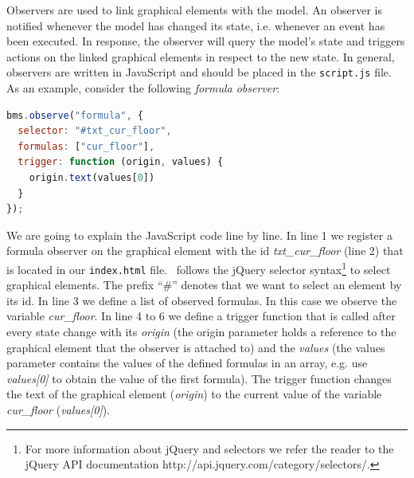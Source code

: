 Observers are used to link graphical elements with the model. 
An observer is notified whenever the model has changed its state, i.e. whenever an event has been executed. 
In response, the observer will query the model's state and triggers actions on the linked graphical elements in respect to the new state.
In general, observers are written in JavaScript and should be placed in the \texttt{script.js} file. 
As an example, consider the following \textit{formula observer}:

\begin{lstlisting}[language=JavaScript, caption={Formula Observer Displaying the Current Floor (JavaScript)}]
bms.observe("formula", {
  selector: "#txt_cur_floor",
  formulas: ["cur_floor"],
  trigger: function (origin, values) {
    origin.text(values[0])
  }
});
\end{lstlisting}


We are going to explain the JavaScript code line by line.
In line 1 we register a formula observer on the graphical element with the id \textit{txt\_cur\_floor} (line 2) that is located in our \texttt{index.html} file.
\bms~follows the jQuery selector syntax\footnote{For more information about jQuery and selectors we refer the reader to the jQuery
API documentation http://api.jquery.com/category/selectors/.} to select graphical elements.
The prefix ``\#'' denotes that we want to select an element by its id.
In line 3 we define a list of observed formulas.
In this case we observe the variable \textit{cur\_floor}.
In line 4 to 6 we define a trigger function that is called after every state change with its \textit{origin} (the origin parameter holds a reference to the graphical element that the observer is attached to) and the \textit{values} (the values parameter contains the values of the defined formulas in an array, e.g. use \textit{values[0]} to obtain the value of the first formula).
The trigger function changes the text of the graphical element (\textit{origin}) to the current value of the variable \textit{cur\_floor} (\textit{values[0]}).

